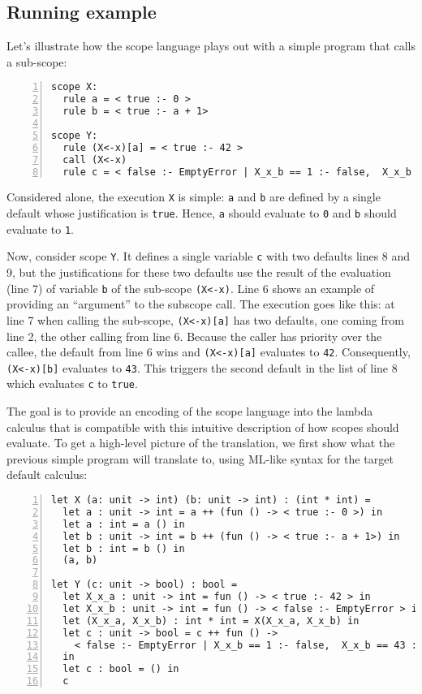 \documentclass[11pt,a4paper]{article}
\begin{document}
\subsection{Running example}

Let's illustrate how the scope language plays out with a simple program 
that calls a sub-scope:
\begin{Verbatim}[frame=lines,label=Simple scope program, numbers=left, framesep=10pt]
scope X:
  rule a = < true :- 0 >
  rule b = < true :- a + 1>

scope Y:
  rule (X<-x)[a] = < true :- 42 >
  call (X<-x)
  rule c = < false :- EmptyError | X_x_b == 1 :- false,  X_x_b == 43 :- true > 
\end{Verbatim}

Considered alone, the execution \Verb+X+ is simple: \Verb+a+ and \Verb+b+ are defined by 
a single default whose justification is \Verb+true+. Hence, \Verb+a+ should evaluate 
to \Verb+0+ and \Verb+b+ should evaluate to \Verb+1+.

Now, consider scope \Verb+Y+. It defines a single variable \Verb+c+ with two defaults 
lines 8 and 9, but the justifications for these two defaults use the result of 
the evaluation (line 7) of variable \Verb+b+ of the sub-scope \Verb+(X<-x)+. 
Line 6 shows an example of providing an \enquote{argument} to the  subscope call.
The execution goes like this: at line 7 when calling the sub-scope,
\Verb+(X<-x)[a]+ has two defaults, one coming from line 2, the other calling 
from line 6. Because the caller has priority over the callee, the default from line 
6 wins and \Verb+(X<-x)[a]+ evaluates to \Verb+42+. Consequently,
\Verb+(X<-x)[b]+ evaluates to \Verb+43+.
This triggers the second default in the list of line 8 which evaluates \Verb+c+ to \Verb+true+. 

The goal is to provide an encoding of the scope language 
into the lambda calculus that is compatible with this intuitive description 
of how scopes should evaluate. To get a high-level 
picture of the translation, we first show what the previous simple program will translate 
to, using ML-like syntax for the target default calculus:
\begin{Verbatim}[frame=lines,label=Simple default program, numbers=left, framesep=10pt]
let X (a: unit -> int) (b: unit -> int) : (int * int) =
  let a : unit -> int = a ++ (fun () -> < true :- 0 >) in
  let a : int = a () in  
  let b : unit -> int = b ++ (fun () -> < true :- a + 1>) in 
  let b : int = b () in
  (a, b)

let Y (c: unit -> bool) : bool = 
  let X_x_a : unit -> int = fun () -> < true :- 42 > in
  let X_x_b : unit -> int = fun () -> < false :- EmptyError > in 
  let (X_x_a, X_x_b) : int * int = X(X_x_a, X_x_b) in 
  let c : unit -> bool = c ++ fun () -> 
    < false :- EmptyError | X_x_b == 1 :- false,  X_x_b == 43 :- true > 
  in 
  let c : bool = () in 
  c 
\end{Verbatim}
\end{document}
